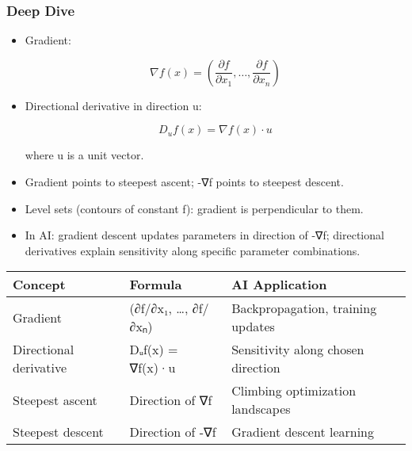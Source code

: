 \documentclass[
  letterpaper,
  DIV=11,
  numbers=noendperiod]{scrreprt}
\begin{document}
\subsubsection{Deep Dive}\label{deep-dive-113}

\begin{itemize}
\item
  Gradient:

  \[
  \nabla f(x) = \left( \frac{\partial f}{\partial x_1}, \dots, \frac{\partial f}{\partial x_n} \right)
  \]
\item
  Directional derivative in direction u:

  \[
  D_u f(x) = \nabla f(x) \cdot u
  \]

  where u is a unit vector.
\item
  Gradient points to steepest ascent; -∇f points to steepest descent.
\item
  Level sets (contours of constant f): gradient is perpendicular to
  them.
\item
  In AI: gradient descent updates parameters in direction of -∇f;
  directional derivatives explain sensitivity along specific parameter
  combinations.
\end{itemize}

\begin{longtable}[]{@{}
  >{\raggedright\arraybackslash}p{}
  >{\raggedright\arraybackslash}p{}
  >{\raggedright\arraybackslash}p{}@{}}
\toprule\noalign{}
\begin{minipage}[b]{\linewidth}\raggedright
Concept
\end{minipage} & \begin{minipage}[b]{\linewidth}\raggedright
Formula
\end{minipage} & \begin{minipage}[b]{\linewidth}\raggedright
AI Application
\end{minipage} \\
\midrule\noalign{}
\endhead
\bottomrule\noalign{}
\endlastfoot
Gradient & (∂f/∂x₁, \ldots, ∂f/∂xₙ) & Backpropagation, training
updates \\
Directional derivative & Dᵤf(x) = ∇f(x)·u & Sensitivity along chosen
direction \\
Steepest ascent & Direction of ∇f & Climbing optimization landscapes \\
Steepest descent & Direction of -∇f & Gradient descent learning \\
\end{longtable}
\end{document}

